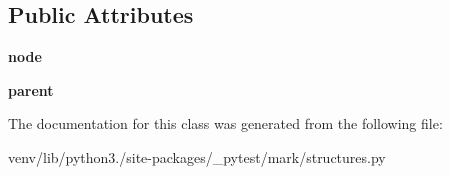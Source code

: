 \subsection*{Public Attributes}
\begin{DoxyCompactItemize}
\item 
\mbox{\label{class__pytest_1_1mark_1_1structures_1_1_node_keywords_a91fe609f0c62ca96a46a387f543296b7}} 
{\bfseries node}
\item 
\mbox{\label{class__pytest_1_1mark_1_1structures_1_1_node_keywords_a6e70ea65e6c7c5baaabe4c8aad7aacb4}} 
{\bfseries parent}
\end{DoxyCompactItemize}


The documentation for this class was generated from the following file\+:\begin{DoxyCompactItemize}
\item 
venv/lib/python3./site-\/packages/\+\_\+pytest/mark/structures.\+py\end{DoxyCompactItemize}
